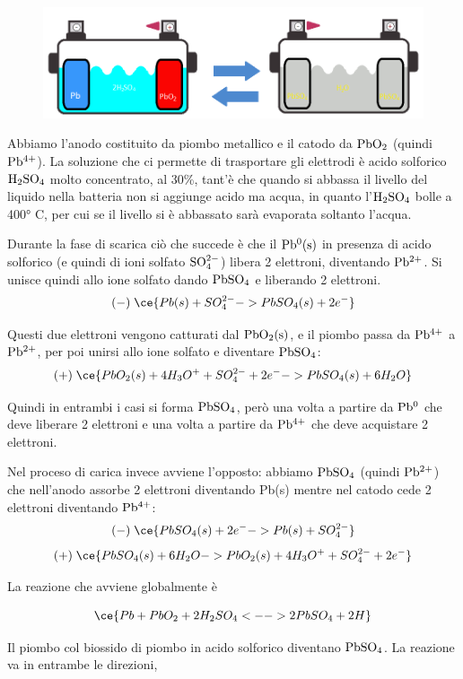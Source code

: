 \begin{figure}[H]
    \centering
    \includegraphics[width=15cm]{immagini/accumulatore_al_piombo.png}
\end{figure}

Abbiamo l'anodo costituito da piombo metallico e il catodo da $\rm PbO_2$ (quindi $\rm Pb^{4+}$). La soluzione che ci permette di trasportare gli elettrodi è acido solforico $\rm H_2SO_4$ molto concentrato, al 30\%, tant'è che quando si abbassa il livello del liquido nella batteria non si aggiunge acido ma acqua, in quanto l'$\rm H_2SO_4$ bolle a 400° C, per cui se il livello si è abbassato sarà evaporata soltanto l'acqua.

Durante la fase di scarica ciò che succede è che il $\rm Pb^0(s)$ in presenza di acido solforico (e quindi di ioni solfato $\rm SO_4^{2-}$) libera 2 elettroni, diventando $\rm Pb^{2+}$. Si unisce quindi allo ione solfato dando $\rm PbSO_4$ e liberando 2 elettroni.
$$(-)\; \ce{Pb(s) + SO_4^{2-} -> PbSO_4(s) + 2e^-}$$

Questi due elettroni vengono catturati dal $\rm PbO_2(s)$, e il piombo passa da $\rm Pb^{4+}$ a $\rm Pb^{2+}$, per poi unirsi allo ione solfato e diventare $\rm PbSO_4$:
$$(+)\; \ce{PbO_2(s) + 4H_3O^+ + SO_4^{2-} +2e^- -> PbSO_4(s) + 6H_2O}$$

Quindi in entrambi i casi si forma $\rm PbSO_4$, però una volta a partire da $\rm Pb^0$ che deve liberare 2 elettroni e una volta a partire da $\rm Pb^{4+}$ che deve acquistare 2 elettroni.

Nel proceso di carica invece avviene l'opposto: abbiamo $\rm PbSO_4$ (quindi $\rm Pb^{2+}$) che nell'anodo assorbe 2 elettroni diventando Pb(s) mentre nel catodo cede 2 elettroni diventando $\rm Pb^{4+}$:
$$(-) \; \ce{PbSO_4(s) + 2e^- -> Pb(s) + SO_4^{2-}}$$
$$(+) \; \ce{PbSO_4(s) + 6H_2O  -> PbO_2(s) + 4H_3O^+ + SO_4^{2-} +2e^-}$$

La reazione che avviene globalmente è

$$\ce{Pb + PbO_2 + 2H_2SO_4 <--> 2PbSO_4 + 2H}$$

Il piombo col biossido di piombo in acido solforico diventano $\rm PbSO_4$. La reazione va in entrambe le direzioni,

